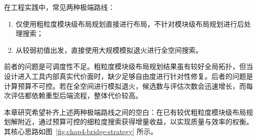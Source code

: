 在工程实践中，常见两种极端路线：
\begin{enumerate}
    \item 仅使用粗粒度模块级布局规划直接进行布局，不针对模块级布局规划进行后处理搜索；
    \item 从较弱初值出发，直接使用大规模模拟退火进行全空间搜索。
\end{enumerate}

前者的问题是可调度性不足。粗粒度模块级布局规划结果虽有较好全局拓扑，但当设计进入工具内部真实代价面时，缺少足够自由度进行针对性修复。后者的问题是计算预算不可控。若在全空间进行模拟退火，候选数与评估次数会迅速增长，而每次评估都依赖重型后端流程，整体代价较高。

本章研究希望补齐上述两种极端路线之间的空白：在已有较优粗粒度模块级布局规划解附近，通过预算可控的细粒度搜索获得增量收益，以实现质量与效率的权衡。
其核心思路如图~\ref{fig:chap4-bridge-strategy} 所示。

